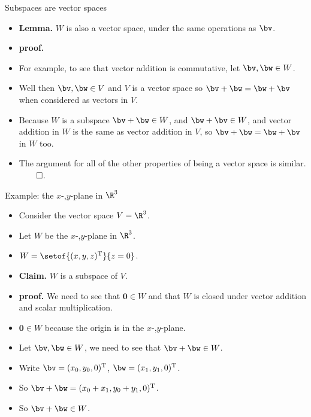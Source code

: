 \documentclass{beamer}
\begin{document}
\begin{frame}{Subspaces are vector spaces}

\begin{itemize}
\item \textbf{Lemma.} $W$ is also a vector space, under the same operations
as $\bv$.
\item \textbf{proof.}
\item For example, to see that vector addition is commutative, let
$\bv,\bw\in W$.
\item Well then $\bv,\bw\in V$ and $V$ is a vector space so $\bv+\bw=\bw+\bv$
when considered as vectors in $V$.
\item Because $W$ is a subspace $\bv + \bw\in W$, and $\bw + \bv\in W$,
and vector addition in $W$ is the same as vector addition in $V$, so
$\bv+\bw=\bw+\bv$ in $W$ too.
\item The argument for all of the other properties of being a vector space
is similar. $\qed$.
\end{itemize}
\end{frame}


\begin{frame}{Example: the $x$-,$y$-plane in $\R^3$}

\begin{itemize}
\item Consider the vector space $V = \R^3$.
\item Let $W $ be the $x$-,$y$-plane in $\R^3$.
\item $W = \setof{(x,y,z)^{\text{T}}}{z = 0}$.
\item \textbf{Claim.} $W$ is a subspace of $V$.
\item \textbf{proof.} We need to see that $\textbf{0}\in W$ and that
$W$ is closed under vector
addition and scalar multiplication.
\item $\textbf{0} \in W$ because the origin is in the $x$-,$y$-plane.
\item Let $\bv,\bw\in W$, we need to see that $\bv+\bw\in W$.
\item Write $\bv=(x_0, y_0, 0)^{\text{T}}$, $\bw = (x_1, y_1,0)^{\text{T}}$.
\item So $\bv+\bw = (x_0 + x_1, y_0 + y_1, 0)^{\text{T}}$.
\item So $\bv+\bw \in W$.
\end{itemize}
\end{frame}
\end{document}
